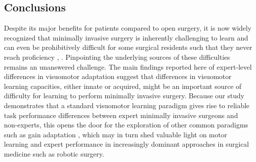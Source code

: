 \documentclass[man, 11pt, longtable, floatsintext, notab]{apa6}
\begin{document}
\subsection{Conclusions}
Despite its major benefits for patients compared to open
surgery, it is now widely recognized that minimally invasive
surgery is inherently challenging to learn and can even be
prohibitively difficult for some surgical residents such
that they never reach proficiency
\cite{green_action_2003}, \cite{buckley_impact_2014}.
Pinpointing the underlying sources of these difficulties
remains an unanswered challenge. The main findings reported
here of expert-level differences in visuomotor adaptation
suggest that differences in visuomotor learning capacities,
either innate or acquired, might be an important source of
difficulty for learning to perform minimally invasive
surgery. Because our study demonstrates that a standard
visuomotor learning paradigm gives rise to reliable task
performance differences between expert minimally invasive
surgeons and non-experts, this opens the door for the
exploration of other common paradigms such as gain
adaptation \cite{krakauer_learning_2000}, which may in turn
shed valuable light on motor learning and expert performance
in increasingly dominant approaches in surgical medicine
such as robotic surgery.

\printbibliography
\end{document}
